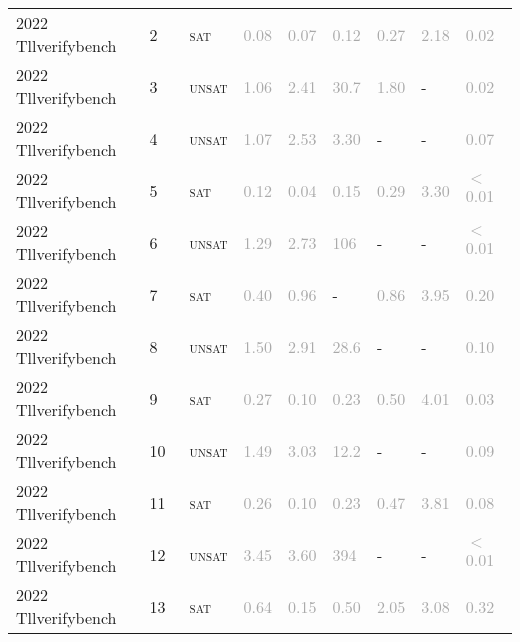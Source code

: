 \begin{center}
{\begin{longtable}{@{}lllllllll@{}}
2022 Tllverifybench & 2 & ~\textsc{sat} & \textcolor{darkgray}{0.08} & \textcolor{darkgray}{0.07} & \textcolor{darkgray}{0.12} & \textcolor{darkgray}{0.27} & \textcolor{darkgray}{2.18} & \textcolor{darkgray}{0.02} \\
2022 Tllverifybench & 3 & ~\textsc{unsat} & \textcolor{darkgray}{1.06} & \textcolor{darkgray}{2.41} & \textcolor{darkgray}{30.7} & \textcolor{darkgray}{1.80} & - & \textcolor{darkgray}{0.02} \\
2022 Tllverifybench & 4 & ~\textsc{unsat} & \textcolor{darkgray}{1.07} & \textcolor{darkgray}{2.53} & \textcolor{darkgray}{3.30} & - & - & \textcolor{darkgray}{0.07} \\
2022 Tllverifybench & 5 & ~\textsc{sat} & \textcolor{darkgray}{0.12} & \textcolor{darkgray}{0.04} & \textcolor{darkgray}{0.15} & \textcolor{darkgray}{0.29} & \textcolor{darkgray}{3.30} & \textcolor{darkgray}{$<$0.01} \\
2022 Tllverifybench & 6 & ~\textsc{unsat} & \textcolor{darkgray}{1.29} & \textcolor{darkgray}{2.73} & \textcolor{darkgray}{106} & - & - & \textcolor{darkgray}{$<$0.01} \\
2022 Tllverifybench & 7 & ~\textsc{sat} & \textcolor{darkgray}{0.40} & \textcolor{darkgray}{0.96} & - & \textcolor{darkgray}{0.86} & \textcolor{darkgray}{3.95} & \textcolor{darkgray}{0.20} \\
2022 Tllverifybench & 8 & ~\textsc{unsat} & \textcolor{darkgray}{1.50} & \textcolor{darkgray}{2.91} & \textcolor{darkgray}{28.6} & - & - & \textcolor{darkgray}{0.10} \\
2022 Tllverifybench & 9 & ~\textsc{sat} & \textcolor{darkgray}{0.27} & \textcolor{darkgray}{0.10} & \textcolor{darkgray}{0.23} & \textcolor{darkgray}{0.50} & \textcolor{darkgray}{4.01} & \textcolor{darkgray}{0.03} \\
2022 Tllverifybench & 10 & ~\textsc{unsat} & \textcolor{darkgray}{1.49} & \textcolor{darkgray}{3.03} & \textcolor{darkgray}{12.2} & - & - & \textcolor{darkgray}{0.09} \\
2022 Tllverifybench & 11 & ~\textsc{sat} & \textcolor{darkgray}{0.26} & \textcolor{darkgray}{0.10} & \textcolor{darkgray}{0.23} & \textcolor{darkgray}{0.47} & \textcolor{darkgray}{3.81} & \textcolor{darkgray}{0.08} \\
2022 Tllverifybench & 12 & ~\textsc{unsat} & \textcolor{darkgray}{3.45} & \textcolor{darkgray}{3.60} & \textcolor{darkgray}{394} & - & - & \textcolor{darkgray}{$<$0.01} \\
2022 Tllverifybench & 13 & ~\textsc{sat} & \textcolor{darkgray}{0.64} & \textcolor{darkgray}{0.15} & \textcolor{darkgray}{0.50} & \textcolor{darkgray}{2.05} & \textcolor{darkgray}{3.08} & \textcolor{darkgray}{0.32} \\

\end{longtable}}
\end{center}
